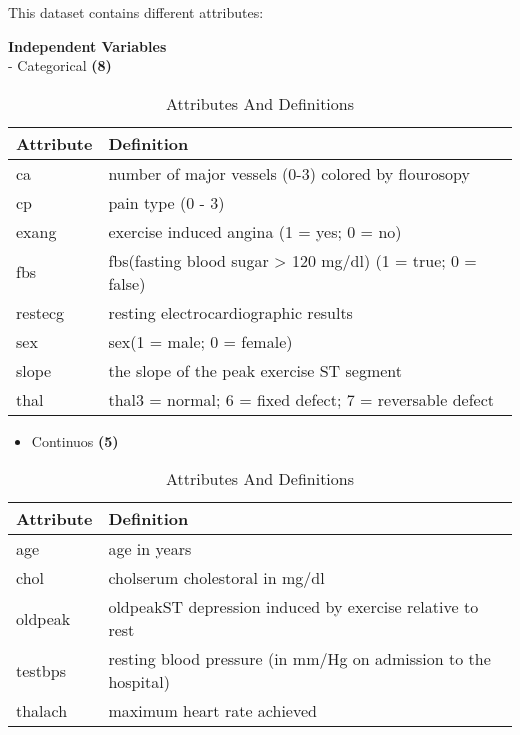 \documentclass[]{article}
\providecommand{\tightlist}{%
  \setlength{\itemsep}{0pt}\setlength{\parskip}{0pt}}
\begin{document}
This dataset contains different attributes:

\textbf{\textcolor{my.dark.gray}{Independent Variables}}\\
- \textcolor{my.orange}{Categorical}
\textbf{\textcolor{my.dark.gray}{(8)}}

\begin{table}[!h]

\caption{\label{tab:table.categorical.attributes}Attributes And Definitions}
\centering
\begin{tabular}{ll}
\toprule
Attribute & Definition\\
\midrule
\rowcolor{gray!6}  ca & number of major vessels (0-3) colored by flourosopy\\
cp & pain type (0 - 3)\\
\rowcolor{gray!6}  exang & exercise induced angina (1 = yes; 0 = no)\\
fbs & fbs(fasting blood sugar > 120 mg/dl) (1 = true; 0 = false)\\
\rowcolor{gray!6}  restecg & resting electrocardiographic results\\
\addlinespace
sex & sex(1 = male; 0 = female)\\
\rowcolor{gray!6}  slope & the slope of the peak exercise ST segment\\
thal & thal3 = normal; 6 = fixed defect; 7 = reversable defect\\
\bottomrule
\end{tabular}
\end{table}

\begin{itemize}
\tightlist
\item
  \textcolor{my.orange}{Continuos}
  \textbf{\textcolor{my.dark.gray}{(5)}}
\end{itemize}

\begin{table}[!h]

\caption{\label{tab:table.continuous.attributes}Attributes And Definitions}
\centering
\begin{tabular}{ll}
\toprule
Attribute & Definition\\
\midrule
\rowcolor{gray!6}  age & age in years\\
chol & cholserum cholestoral in mg/dl\\
\rowcolor{gray!6}  oldpeak & oldpeakST depression induced by exercise relative to rest\\
testbps & resting blood pressure (in mm/Hg on admission to the hospital)\\
\rowcolor{gray!6}  thalach & maximum heart rate achieved\\
\bottomrule
\end{tabular}
\end{table}
\end{document}
